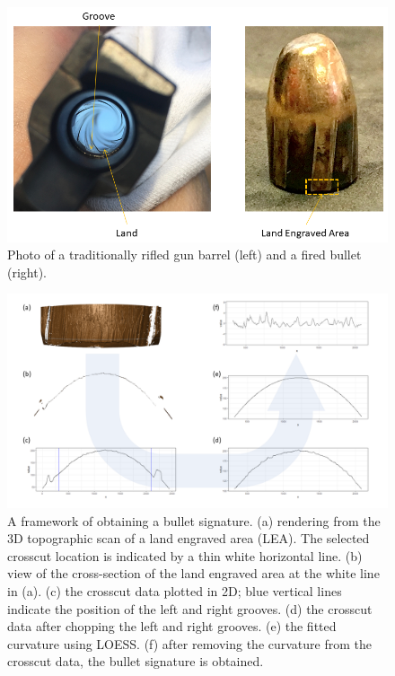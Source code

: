 \begin{Schunk}
\begin{figure}

{\centering \includegraphics[width=.8\textwidth]{ju-hofmann_files/figure-latex/barrel_bullet_ps} 

}

\caption[Photo of a traditionally rifled gun barrel (left) and a fired bullet (right)]{Photo of a traditionally rifled gun barrel (left) and a fired bullet (right).}\label{fig:bullet}
\end{figure}
\end{Schunk}

\begin{Schunk}
\begin{figure}

{\centering \includegraphics[width=.9\textwidth]{ju-hofmann_files/figure-latex/figure1_v2} 

}

\caption[A framework of obtaining a bullet signature]{A framework of obtaining a bullet signature. (a) rendering from the 3D topographic scan of a land engraved area (LEA). The selected crosscut location is indicated by a thin white horizontal line. (b) view of the cross-section of the land engraved area at the white line in (a). (c) the crosscut data plotted in 2D; blue vertical lines indicate the position of the left and right grooves. (d) the crosscut data after chopping the left and right grooves. (e) the fitted curvature using LOESS. (f) after removing the curvature from the crosscut data, the bullet signature is obtained.}\label{fig:process}
\end{figure}
\end{Schunk}

